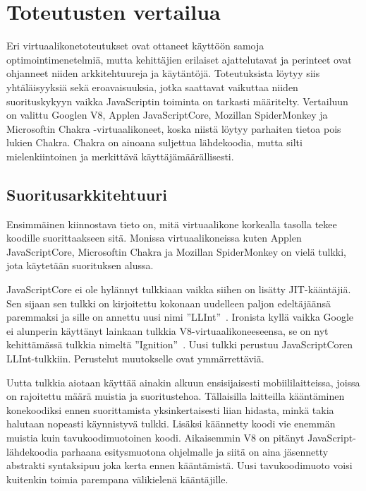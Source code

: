 \pagebreak
\section{Toteutusten vertailua}

Eri virtuaalikonetoteutukset ovat ottaneet käyttöön samoja optimointimenetelmiä, mutta kehittäjien erilaiset ajattelutavat ja perinteet ovat ohjanneet niiden arkkitehtuureja ja käytäntöjä. Toteutuksista löytyy siis yhtäläisyyksiä sekä eroavaisuuksia, jotka saattavat vaikuttaa niiden suorituskykyyn vaikka JavaScriptin toiminta on tarkasti määritelty. Vertailuun on valittu Googlen V8, Applen JavaScriptCore, Mozillan SpiderMonkey ja Microsoftin Chakra -virtuaalikoneet, koska niistä löytyy parhaiten tietoa pois lukien Chakra. Chakra on ainoana suljettua lähdekoodia, mutta silti mielenkiintoinen ja merkittävä käyttäjämäärällisesti.

\subsection{Suoritusarkkitehtuuri}

Ensimmäinen kiinnostava tieto on, mitä virtuaalikone korkealla tasolla tekee koodille suorittaakseen sitä. Monissa virtuaalikoneissa kuten Applen JavaScriptCore, Microsoftin Chakra ja Mozillan SpiderMonkey on vielä tulkki, jota käytetään suorituksen alussa.

JavaScriptCore ei ole hylännyt tulkkiaan vaikka siihen on lisätty JIT-kääntäjiä. Sen sijaan sen tulkki on kirjoitettu kokonaan uudelleen paljon edeltäjäänsä paremmaksi ja sille on annettu uusi nimi ''LLInt''~\cite{llint}. Ironista kyllä vaikka Google ei alunperin käyttänyt lainkaan tulkkia V8-virtuaalikoneeseensa, se on nyt kehittämässä tulkkia nimeltä ''Ignition''~\cite{v8ignition}. Uusi tulkki perustuu JavaScriptCoren LLInt-tulkkiin. Perustelut muutokselle ovat ymmärrettäviä.

Uutta tulkkia aiotaan käyttää ainakin alkuun ensisijaisesti mobiililaitteissa, joissa on rajoitettu määrä muistia ja suoritustehoa. Tällaisilla laitteilla kääntäminen konekoodiksi ennen suorittamista yksinkertaisesti liian hidasta, minkä takia halutaan nopeasti käynnistyvä tulkki. Lisäksi käännetty koodi vie enemmän muistia kuin tavukoodimuotoinen koodi. Aikaisemmin V8 on pitänyt JavaScript-lähdekoodia parhaana esitysmuotona ohjelmalle ja siitä on aina jäsennetty abstrakti syntaksipuu joka kerta ennen kääntämistä. Uusi tavukoodimuoto voisi kuitenkin toimia parempana välikielenä kääntäjille.

